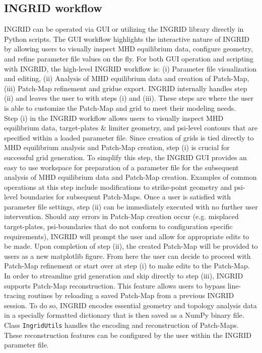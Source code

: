 \subsection{\label{sec:level2}INGRID workflow}
INGRID can be operated via GUI or utilizing the INGRID library directly in Python scripts. The GUI workflow highlights the interactive nature of INGRID by allowing users to visually inspect MHD equilibrium data, configure geometry, and refine parameter file values on the fly. For both GUI operation and scripting with INGRID, the high-level INGRID workflow is: (i)  Parameter file visualization and editing, (ii) Analysis of MHD equilibrium data and creation of Patch-Map, (iii) Patch-Map refinement and gridue export.
\noindent
INGRID internally handles step (ii) and leaves the user to with steps (i) and (iii). These steps are where the user is able to customize the Patch-Map and grid to meet their modeling needs.\\ \indent
Step (i) in the INGRID workflow allows users to visually inspect MHD equilibrium data, target-plates \& limiter geometry, and psi-level contours that are specified within a loaded parameter file. Since creation of grids is tied directly to MHD equilibrium analysis and Patch-Map creation, step (i) is crucial for successful grid generation. To simplify this step, the INGRID GUI provides an easy to use workspace for preparation of a parameter file for the subsequent analysis of MHD equilibrium data and Patch-Map creation. Examples of common operations at this step include modifications to strike-point geometry and psi-level boundaries for subsequent Patch-Maps. Once a user is satisfied with parameter file settings, step (ii) can be immediately executed with no further user intervention. Should any errors in Patch-Map creation occur (e.g. misplaced target-plates, psi-boundaries that do not conform to configuration specific requirements), INGRID will prompt the user and allow for appropriate edits to be made. Upon completion of step (ii), the created Patch-Map will be provided to users as a new matplotlib figure. From here the user can decide to proceed with Patch-Map refinement or start over at step (i) to make edits to the Patch-Map.\\ \indent
In order to streamline grid generation and skip directly to step (iii), INGRID supports Patch-Map reconstruction. This feature allows users to bypass line-tracing routines by reloading a saved Patch-Map from a previous INGRID session. To do so, INGRID encodes essential geometry and topology analysis data in a specially formatted dictionary that is then saved as a NumPy binary file. Class \texttt{IngridUtils} handles the encoding and reconstruction of Patch-Maps. These reconstruction features can be configured by the user within the INGRID parameter file.\\ \indent
